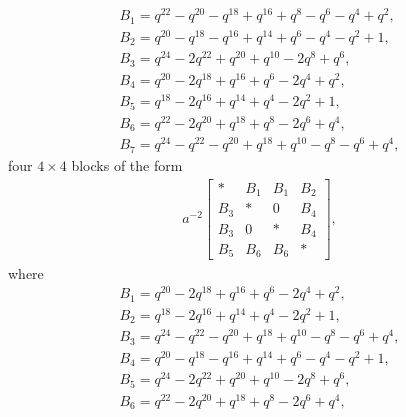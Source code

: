 \documentclass[10pt,a4paper]{amsart}
\numberwithin{equation}{section}
\theoremstyle{definition}
\newcommand{\flac}[2]{#1}
\begin{document}
\begin{gather*}
 B_1 = \flac{q^{22}}{a^2}-\flac{q^{20}}{a^2}-\flac{q^{18}}{a^2}+\flac{q^{16}}{a^2}+\flac{q^{8}}{a^2}-\flac{q^{6}}{a^2}-\flac{q^{4}}{a^2}+\flac{q^{2}}{a^2}, \\
 B_2 = \flac{q^{20}}{a^2}-\flac{q^{18}}{a^2}-\flac{q^{16}}{a^2}+\flac{q^{14}}{a^2}+\flac{q^{6}}{a^2}-\flac{q^{4}}{a^2}-\flac{q^{2}}{a^2}+\flac{1}{a^2}, \\
 B_3 = \flac{q^{24}}{a^2}-\flac{2q^{22}}{a^2}+\flac{q^{20}}{a^2}+\flac{q^{10}}{a^2}-\flac{2q^{8}}{a^2}+\flac{q^{6}}{a^2}, \\
 B_4 = \flac{q^{20}}{a^2}-\flac{2q^{18}}{a^2}+\flac{q^{16}}{a^2}+\flac{q^{6}}{a^2}-\flac{2q^{4}}{a^2}+\flac{q^{2}}{a^2}, \\
 B_5 = \flac{q^{18}}{a^2}-\flac{2q^{16}}{a^2}+\flac{q^{14}}{a^2}+\flac{q^{4}}{a^2}-\flac{2q^{2}}{a^2}+\flac{1}{a^2}, \\
 B_6 = \flac{q^{22}}{a^2}-\flac{2q^{20}}{a^2}+\flac{q^{18}}{a^2}+\flac{q^{8}}{a^2}-\flac{2q^{6}}{a^2}+\flac{q^{4}}{a^2},\\
 B_7 = \flac{q^{24}}{a^2}-\flac{q^{22}}{a^2}-\flac{q^{20}}{a^2}+\flac{q^{18}}{a^2}+\flac{q^{10}}{a^2}-\flac{q^{8}}{a^2}-\flac{q^{6}}{a^2}+\flac{q^{4}}{a^2},
\end{gather*}
four $4 \times 4$ blocks of the form
\begin{align*}
 a^{-2}\begin{bmatrix}
 * & B_1 & B_1 & B_2 \\
 B_3 & * & 0 & B_4 \\
 B_3 & 0 & * & B_4 \\
 B_5 & B_6 & B_6 & *
 \end{bmatrix},
\end{align*}
where
\begin{gather*}
 B_1 = \flac{q^{20}}{a^2}-\flac{2q^{18}}{a^2}+\flac{q^{16}}{a^2}+\flac{q^{6}}{a^2}-\flac{2q^{4}}{a^2}+\flac{q^{2}}{a^2}, \\
 B_2 = \flac{q^{18}}{a^2}-\flac{2q^{16}}{a^2}+\flac{q^{14}}{a^2}+\flac{q^{4}}{a^2}-\flac{2q^{2}}{a^2}+\flac{1}{a^2}, \\
 B_3 = \flac{q^{24}}{a^2}-\flac{q^{22}}{a^2}-\flac{q^{20}}{a^2}+\flac{q^{18}}{a^2}+\flac{q^{10}}{a^2}-\flac{q^{8}}{a^2}-\flac{q^{6}}{a^2}+\flac{q^{4}}{a^2}, \\
 B_4 = \flac{q^{20}}{a^2}-\flac{q^{18}}{a^2}-\flac{q^{16}}{a^2}+\flac{q^{14}}{a^2}+\flac{q^{6}}{a^2}-\flac{q^{4}}{a^2}-\flac{q^{2}}{a^2}+\flac{1}{a^2}, \\
 B_5 = \flac{q^{24}}{a^2}-\flac{2q^{22}}{a^2}+\flac{q^{20}}{a^2}+\flac{q^{10}}{a^2}-\flac{2q^{8}}{a^2}+\flac{q^{6}}{a^2}, \\
 B_6 = \flac{q^{22}}{a^2}-\flac{2q^{20}}{a^2}+\flac{q^{18}}{a^2}+\flac{q^{8}}{a^2}-\flac{2q^{6}}{a^2}+\flac{q^{4}}{a^2},
\end{gather*}
\end{document}
